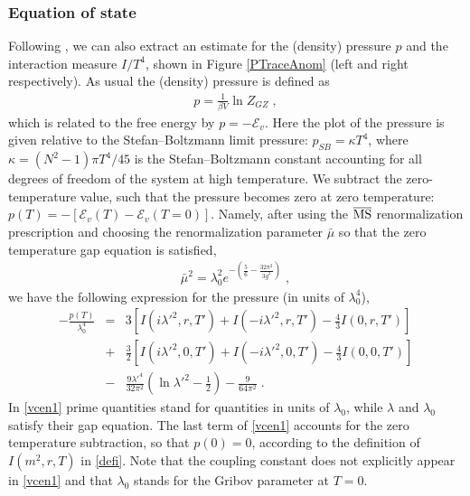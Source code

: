 \subsubsection{Equation of state}

Following \cite{Philipsen:2012nu}, we can also extract an estimate for the
(density) pressure $p$ and the interaction measure $I/T^{4}$, shown in
Figure \ref{PTraceAnom} (left and right  respectively). As usual the
(density) pressure is defined as
\begin{eqnarray}
p = \frac{1}{\beta V}\ln Z_{GZ}\;,
\end{eqnarray}
which is related to the free energy by $p = -\mathcal{E}_{v}$. Here the plot of the pressure is given relative to the Stefan--Boltzmann limit pressure: $p_{SB} = \kappa T^{4}$, where $\kappa = (N^2 -1)\pi T^{4}/45$ is the Stefan--Boltzmann constant accounting for all degrees of freedom of the system at high temperature. We subtract the zero-temperature value, such that the pressure becomes zero at zero temperature: $p(T) = - [\mathcal{E}_{v}(T) - \mathcal{E}_{v}(T=0)]$. Namely, after using the $\overline{\mbox{MS}}$ renormalization prescription and choosing the renormalization parameter $\bar{\mu}$ so that the zero temperature gap equation is satisfied,
\begin{eqnarray}
{\bar{\mu}}^2 = \lambda^{2}_{0}e^{-\left(  \frac{5}{6} - \frac{32\pi^2}{3g^{2}} \right)}\;,
\end{eqnarray}
we have the following expression for the pressure (in units of $\lambda_{0}^{4}$),
\begin{eqnarray}
-\frac{p(T)}{\lambda_{0}^{4}} &=& 3 \left[  I(i\lambda'^{2},r,T') + I(-i\lambda'^{2},r,T') - \frac{4}{3}I(0,r,T')\right]
\nonumber \\
&+&
\frac{3}{2} \left[ I(i\lambda'^{2},0,T') + I(-i\lambda'^{2},0,T') - \frac{4}{3}I(0,0,T')\right]
\nonumber \\
&-&
\frac{9\lambda'^{4}}{32\pi^2 } \left(  \ln \lambda'^{2}  - \frac12 \right) - \frac{9}{64\pi^{2}}
\;. \label{vcen1}
\end{eqnarray}
In \eqref{vcen1} prime quantities stand for quantities in units of $\lambda_{0}$, while $\lambda$ and $\lambda_{0}$ satisfy their gap equation. The last term of \eqref{vcen1} accounts for the zero temperature subtraction, so that $p(0) = 0$, according to the definition of $I(m^2, r,T)$ in \eqref{defi}. Note that the coupling constant does not explicitly appear in \eqref{vcen1} and that $\lambda_{0}$ stands for the Gribov parameter at $T=0$.

